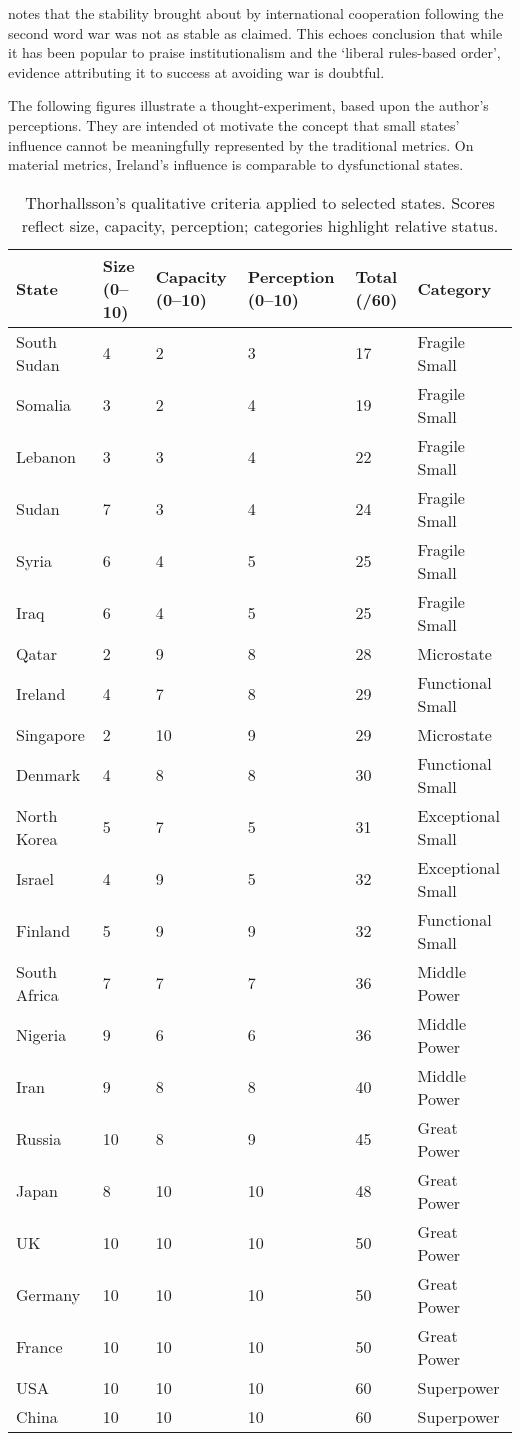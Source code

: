 \textcite{HINTON_2020} notes that the stability brought about by international cooperation following the second word war was not as stable as claimed. This echoes \textcite{MEARSHEIMER_1994} conclusion that while it has been popular to praise institutionalism and the `liberal rules-based order', evidence attributing it to success at avoiding war is doubtful.

The following figures illustrate a thought-experiment, based upon the author's perceptions. They are intended ot motivate the concept that small states' influence cannot be meaningfully represented by the traditional metrics. On material metrics, Ireland's influence is comparable to dysfunctional states. 
\begin{table}[ht]
	\centering
	\begin{tabular}{p{2.8cm} p{1.5cm} p{1.8cm} p{2cm} p{1.8cm} p{2cm}}
		\hline
		\textbf{State} & \textbf{Size (0–10)} & \textbf{Capacity (0–10)} & \textbf{Perception (0–10)} & \textbf{Total (/60)} & \textbf{Category} \\
		\hline
		South Sudan & 4 & 2 & 3 & 17 & Fragile Small \\
		Somalia & 3 & 2 & 4 & 19 & Fragile Small \\
		Lebanon & 3 & 3 & 4 & 22 & Fragile Small \\
		Sudan & 7 & 3 & 4 & 24 & Fragile Small \\
		Syria & 6 & 4 & 5 & 25 & Fragile Small \\
		Iraq & 6 & 4 & 5 & 25 & Fragile Small \\
		Qatar & 2 & 9 & 8 & 28 & Microstate \\
		Ireland & 4 & 7 & 8 & 29 & Functional Small \\
		Singapore & 2 & 10 & 9 & 29 & Microstate \\
		Denmark & 4 & 8 & 8 & 30 & Functional Small \\
		North Korea & 5 & 7 & 5 & 31 & Exceptional Small \\
		Israel & 4 & 9 & 5 & 32 & Exceptional Small \\
		Finland & 5 & 9 & 9 & 32 & Functional Small \\
		South Africa & 7 & 7 & 7 & 36 & Middle Power \\
		Nigeria & 9 & 6 & 6 & 36 & Middle Power \\
		Iran & 9 & 8 & 8 & 40 & Middle Power \\
		Russia & 10 & 8 & 9 & 45 & Great Power \\
		Japan & 8 & 10 & 10 & 48 & Great Power \\
		UK & 10 & 10 & 10 & 50 & Great Power \\
		Germany & 10 & 10 & 10 & 50 & Great Power \\
		France & 10 & 10 & 10 & 50 & Great Power \\
		USA & 10 & 10 & 10 & 60 & Superpower \\
		China & 10 & 10 & 10 & 60 & Superpower \\
		\hline
	\end{tabular}
	\caption{Thorhallsson’s qualitative criteria applied to selected states. Scores reflect size, capacity, perception; categories highlight relative status.}
\end{table}

